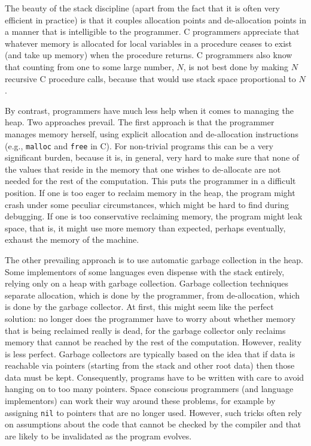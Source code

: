 \documentclass[12pt]{book}
\begin{document}
The beauty of the stack discipline (apart from the fact that it is
often very efficient in practice) is that it couples allocation points
and de-allocation points in a manner that is intelligible to the
programmer. C programmers appreciate that whatever memory is allocated
for local variables in a procedure ceases to exist (and take up
memory) when the procedure returns.
%
C programmers also know that counting from one to some large number,
$N$, is not best done by making $N$ recursive C procedure calls,
because that would use stack space proportional to $N$.

By contrast, programmers have much less help when it comes to managing
the heap.  Two approaches prevail. The first approach is that the
programmer manages memory herself, using explicit allocation and
de-allocation instructions (e.g.,
%
{\tt malloc} and
%
{\tt free} in C). For non-trivial programs this can be a very
significant burden, because it is, in general, very hard to make sure
that none of the values that reside in the memory that one wishes to
de-allocate are not needed for the rest of the computation.  This puts
the programmer in a difficult position. If one is too eager to reclaim
memory in the heap, the program might crash under some peculiar
circumstances, which might be hard to find during debugging.  If one
is too conservative reclaiming memory, the program might leak space,
that is, it might use more memory than expected, perhaps eventually,
exhaust the memory of the machine.

The other prevailing approach is to use automatic garbage collection
in the heap.  Some implementors of some languages even dispense with
the stack entirely, relying only on a heap with garbage collection.
Garbage collection techniques separate allocation, which is done by
the programmer, from de-allocation, which is done by the garbage
collector.  At first, this might seem like the perfect solution: no
longer does the programmer have to worry about whether memory that is
being reclaimed really is dead, for the garbage collector only
reclaims memory that cannot be reached by the rest of the
computation. However, reality is less perfect. Garbage collectors are
typically based on the idea that if data is reachable via pointers
(starting from the stack and other root data) then those data must be
kept. Consequently, programs have to be written with care to avoid
hanging on to too many pointers. Space conscious programmers (and
language implementors) can work their way around these problems, for
example by assigning {\tt nil} to pointers that are no longer used.
However, such tricks often rely on assumptions about the code that
cannot be checked by the compiler and that are likely to be
invalidated as the program evolves.
\end{document}
